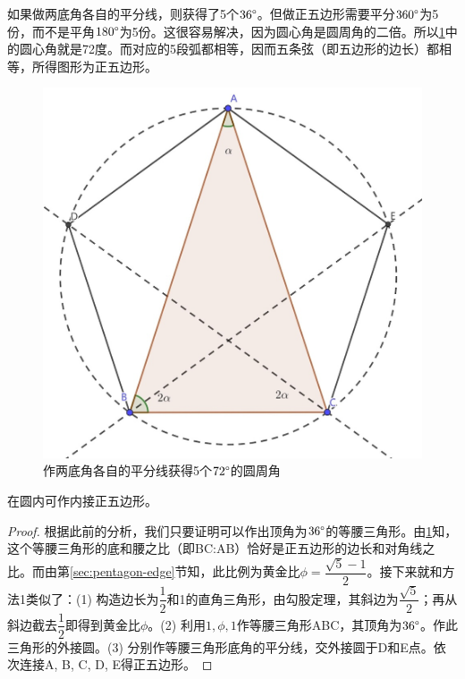 \documentclass[b5paper]{ctexart}
\begin{document}
如果做两底角各自的平分线，则获得了5个$36\degree$。但做正五边形需要平分$360\degree$为5份，而不是平角$180\degree$为5份。这很容易解决，因为圆心角是圆周角的二倍。所以\cref{fig:triangle-pentagon}中的圆心角就是72度。而对应的5段弧都相等，因而五条弦（即五边形的边长）都相等，所得图形为正五边形。

\begin{figure}[htbp]
 \centering
 \includegraphics[scale=0.35]{img/triangle-pentagon}
 \caption{作两底角各自的平分线获得5个$72\degree$的圆周角}
 \label{fig:triangle-pentagon}
\end{figure}

\begin{proposition}[欧几里得《原本》，卷4，命题11]
在圆内可作内接正五边形。
\end{proposition}

\begin{proof}
根据此前的分析，我们只要证明可以作出顶角为$36\degree$的等腰三角形。由\cref{fig:triangle-pentagon}知，这个等腰三角形的底和腰之比（即BC:AB）恰好是正五边形的边长和对角线之比。而由第\ref{sec:pentagon-edge}节知，此比例为黄金比$\phi = \dfrac{\sqrt{5} - 1}{2}$。接下来就和方法1类似了：(1) 构造边长为$\dfrac{1}{2}$和1的直角三角形，由勾股定理，其斜边为$\dfrac{\sqrt{5}}{2}$；再从斜边截去$\dfrac{1}{2}$即得到黄金比$\phi$。(2) 利用$1, \phi, 1$作等腰三角形ABC，其顶角为$36\degree$。作此三角形的外接圆。(3) 分别作等腰三角形底角的平分线，交外接圆于D和E点。依次连接A, B, C, D, E得正五边形。
\end{proof}
\end{document}
